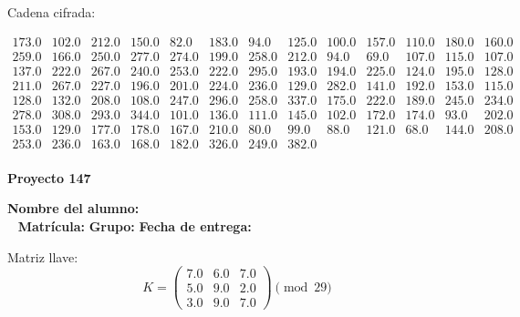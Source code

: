 \documentclass[12pt]{article}
\begin{document}
Cadena cifrada:
\begin{center}
$\begin{array}{lllllllllllll}
173.0 & 102.0 & 212.0 & 150.0 & 82.0 & 183.0 & 94.0 & 125.0 & 100.0 & 157.0 & 110.0 & 180.0 & 160.0\\
259.0 & 166.0 & 250.0 & 277.0 & 274.0 & 199.0 & 258.0 & 212.0 & 94.0 & 69.0 & 107.0 & 115.0 & 107.0\\
137.0 & 222.0 & 267.0 & 240.0 & 253.0 & 222.0 & 295.0 & 193.0 & 194.0 & 225.0 & 124.0 & 195.0 & 128.0\\
211.0 & 267.0 & 227.0 & 196.0 & 201.0 & 224.0 & 236.0 & 129.0 & 282.0 & 141.0 & 192.0 & 153.0 & 115.0\\
128.0 & 132.0 & 208.0 & 108.0 & 247.0 & 296.0 & 258.0 & 337.0 & 175.0 & 222.0 & 189.0 & 245.0 & 234.0\\
278.0 & 308.0 & 293.0 & 344.0 & 101.0 & 136.0 & 111.0 & 145.0 & 102.0 & 172.0 & 174.0 & 93.0 & 202.0\\
153.0 & 129.0 & 177.0 & 178.0 & 167.0 & 210.0 & 80.0 & 99.0 & 88.0 & 121.0 & 68.0 & 144.0 & 208.0\\
253.0 & 236.0 & 163.0 & 168.0 & 182.0 & 326.0 & 249.0 & 382.0\\
\end{array}$
\end{center}

\newpage


\textbf{Proyecto 147}

\textbf{Nombre del alumno:} \underline{\hspace{13cm}}\\\
\vspace{1cm}
\textbf{Matrícula:} \underline{\hspace{4cm}} \hspace{1cm}
\textbf{Grupo:} \underline{\hspace{2cm}}
\textbf{Fecha de entrega:} \underline{\hspace{2cm}}

\medskip

Matriz llave:
\[
K = \begin{pmatrix}
7.0 & 6.0 & 7.0\\
5.0 & 9.0 & 2.0\\
3.0 & 9.0 & 7.0
\end{pmatrix} \pmod{29}
\]
\end{document}
